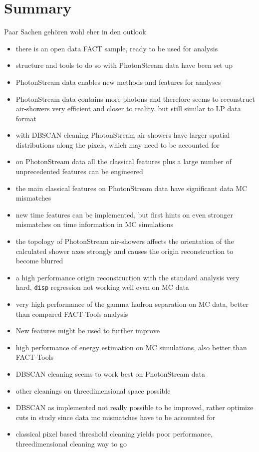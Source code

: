 \chapter{Summary}\label{ch:summary}
%
Paar Sachen gehören wohl eher in den outlook
\begin{itemize}
  \item there is an open data FACT sample, ready to be used for analysis
  \item structure and tools to do so with PhotonStream data have been set up
  \item PhotonStream data enables new methods and features for analyses
  \item PhotonStream data contains more photons and therefore seems to reconstruct air-showers very efficient and closer to reality. but still similar to LP data format
  \item with DBSCAN cleaning PhotonStream air-showers have larger spatial distributions along the pixels, which may need to be accounted for
  \item on PhotonStream data all the classical features plus a large number of unprecedented features can be engineered
  \item the main classical features on PhotonStream data have significant data MC mismatches
  \item new time features can be implemented, but first hints on even stronger mismatches on time information in MC simulations
  \item the topology of PhotonStream air-showers affects the orientation of the calculated shower axes strongly and causes the origin reconstruction to become blurred
  \item a high performance origin reconstruction with the standard analysis very hard, \texttt{disp} regression not working well even on MC data
  \item very high performance of the gamma hadron separation on MC data, better than compared FACT-Tools analysis
  \item New features might be used to further improve
  \item high performance of energy estimation on MC simulations, also better than FACT-Tools
  \item DBSCAN cleaning seems to work best on PhotonStream data
  \item other cleanings on threedimensional space possible
  \item DBSCAN as implemented not really possible to be improved, rather optimize cuts in study since data mc mismatches have to be accounted for
  \item classical pixel based threshold cleaning yields poor performance, threedimensional cleaning way to go
\end{itemize}
